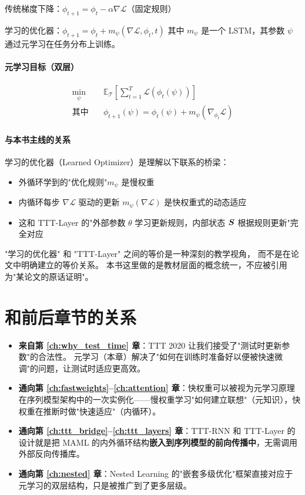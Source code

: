 传统梯度下降：$\phi_{t+1} = \phi_t - \alpha \nabla \mathcal{L}$（固定规则）

学习的优化器：$\phi_{t+1} = \phi_t + m_\psi(\nabla \mathcal{L}, \phi_t, t)$
其中 $m_\psi$ 是一个 LSTM，其参数 $\psi$ 通过元学习在任务分布上训练。

\paragraph{元学习目标（双层）}
\begin{align}
  \min_\psi &\quad \mathbb{E}_{\mathcal{T}} \left[ \sum_{t=1}^T \mathcal{L}(\phi_t(\psi)) \right] \\
  \text{其中} &\quad \phi_{t+1}(\psi) = \phi_t(\psi) + m_\psi(\nabla_{\phi_t} \mathcal{L})
\end{align}

\paragraph{与本书主线的关系}

学习的优化器（Learned Optimizer）是理解以下联系的桥梁：
\begin{itemize}
  \item 外循环学到的"优化规则"$m_\psi$ 是慢权重
  \item 内循环每步 $\nabla \mathcal{L}$ 驱动的更新 $m_\psi(\nabla \mathcal{L})$ 是快权重式的动态适应
  \item 这和 TTT-Layer 的"外部参数 $\theta$ 学习更新规则，内部状态 $\boldsymbol{S}$ 根据规则更新"完全对应
\end{itemize}

\begin{viewpointbox}
"学习的优化器" 和 "TTT-Layer" 之间的等价是一种深刻的教学视角，
而不是在论文中明确建立的等价关系。
本书这里做的是教材层面的概念统一，不应被引用为"某论文的原话证明"。
\end{viewpointbox}

\section{和前后章节的关系}
\label{sec:bilevel_bridges}

\begin{itemize}
  \item \textbf{来自第 \ref{ch:why_test_time} 章}：TTT 2020 让我们接受了"测试时更新参数"的合法性。
    元学习（本章）解决了"如何在训练时准备好以便被快速微调"的问题，让测试时适应更高效。

  \item \textbf{通向第 \ref{ch:fastweights}--\ref{ch:attention} 章}：快权重可以被视为元学习原理在序列模型架构中的一次实例化——慢权重学习"如何建立联想"（元知识），快权重在推断时做"快速适应"（内循环）。

  \item \textbf{通向第 \ref{ch:ttt_bridge}--\ref{ch:ttt_layers} 章}：TTT-RNN 和 TTT-Layer 的设计就是把 MAML 的内外循环结构\textbf{嵌入到序列模型的前向传播中}，无需调用外部反向传播库。

  \item \textbf{通向第 \ref{ch:nested} 章}：Nested Learning 的"嵌套多级优化"框架直接对应于元学习的双层结构，只是被推广到了更多层级。
\end{itemize}

